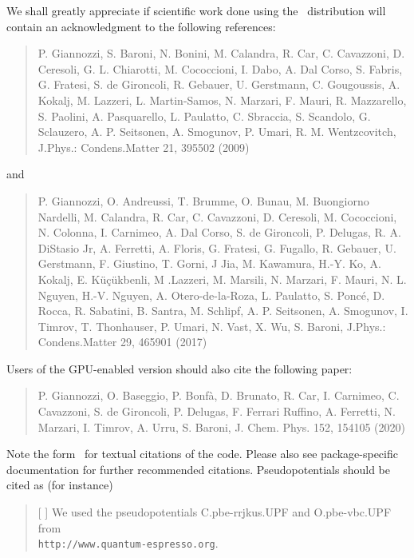We shall greatly appreciate if scientific work done using the \qe\ 
distribution will contain an acknowledgment to the following references:
\begin{quote}
P. Giannozzi, S. Baroni, N. Bonini, M. Calandra, R. Car, C. Cavazzoni,
D. Ceresoli, G. L. Chiarotti, M. Cococcioni, I. Dabo, A. Dal Corso,
S. Fabris, G. Fratesi, S. de Gironcoli, R. Gebauer, U. Gerstmann,
C. Gougoussis, A. Kokalj, M. Lazzeri, L. Martin-Samos, N. Marzari,
F. Mauri, R. Mazzarello, S. Paolini, A. Pasquarello, L. Paulatto,
C. Sbraccia, S. Scandolo, G. Sclauzero, A. P. Seitsonen, A. Smogunov,
P. Umari, R. M. Wentzcovitch,
	J.Phys.: Condens.Matter 21, 395502 (2009)
\end{quote}
and
\begin{quote}
P. Giannozzi, O. Andreussi, T. Brumme, O. Bunau, M. Buongiorno Nardelli, 
M. Calandra, R. Car, C. Cavazzoni, D. Ceresoli, M. Cococcioni, N. Colonna, 
I. Carnimeo, A. Dal Corso, S. de Gironcoli, P. Delugas, R. A. DiStasio Jr,
A. Ferretti, A. Floris, G. Fratesi, G. Fugallo, R. Gebauer, U. Gerstmann,
F. Giustino, T. Gorni, J Jia, M. Kawamura, H.-Y. Ko, A. Kokalj, 
E. K\"u\c{c}\"ukbenli, M .Lazzeri, M. Marsili, N. Marzari, F.  Mauri, 
N. L. Nguyen, H.-V. Nguyen, A. Otero-de-la-Roza, L. Paulatto, S. Ponc\'e, 
D. Rocca, R. Sabatini, B. Santra, M. Schlipf, A. P. Seitsonen, A. Smogunov,
I. Timrov, T. Thonhauser, P. Umari, N. Vast, X. Wu, S. Baroni,
	J.Phys.: Condens.Matter 29, 465901 (2017)
\end{quote}

Users of the GPU-enabled version should also cite the following paper:
\begin{quote}
P. Giannozzi, O. Baseggio, P. Bonf\`a, D. Brunato, R. Car, I. Carnimeo,
C. Cavazzoni, S. de Gironcoli, P. Delugas, F. Ferrari Ruffino,
A. Ferretti, N. Marzari, I. Timrov, A. Urru, S. Baroni, 
        J. Chem. Phys. 152, 154105 (2020)
\end{quote}

Note the form \qe\ for textual citations of the code.
Please also see package-specific documentation for
further recommended citations.
Pseudopotentials should be cited as (for instance)
\begin{quote}
[ ] We used the pseudopotentials C.pbe-rrjkus.UPF
and O.pbe-vbc.UPF from\\
\texttt{http://www.quantum-espresso.org}.
\end{quote}
